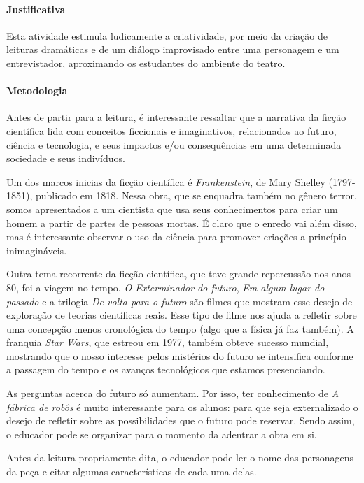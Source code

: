 \documentclass[11pt]{extarticle}
\begin{document}
\paragraph{Justificativa} Esta atividade estimula ludicamente a criatividade, por meio da criação de leituras dramáticas e de um diálogo improvisado entre uma personagem e um entrevistador, aproximando os estudantes do ambiente do teatro.         

\paragraph{Metodologia} Antes de partir para a leitura, é interessante ressaltar que a narrativa da ficção científica lida com conceitos ficcionais e imaginativos, relacionados ao futuro, ciência e tecnologia, e seus impactos e/ou consequências em uma determinada sociedade e seus indivíduos. 

Um dos marcos inicias da ficção científica é \textit{Frankenstein}, de Mary Shelley (1797-1851), publicado em 1818. Nessa obra, que se enquadra também no gênero terror, somos apresentados a um cientista que usa seus conhecimentos para criar um homem a partir de partes de pessoas mortas. É claro que o enredo vai além disso, mas é interessante observar o uso da ciência para promover criações a princípio inimagináveis. 

Outra tema recorrente da ficção científica, que teve grande repercussão nos anos 80, foi a viagem no tempo. \textit{O Exterminador do futuro}, \textit{Em algum lugar do passado} e a trilogia \textit{De volta para o futuro} são filmes que mostram esse desejo de exploração de teorias científicas reais. Esse tipo de filme nos ajuda a refletir sobre uma concepção menos cronológica do tempo (algo que a física já faz também). A franquia \textit{Star Wars}, que estreou em 1977, também obteve sucesso mundial, mostrando que o nosso interesse pelos mistérios do futuro se intensifica conforme a passagem do tempo e os avanços tecnológicos que estamos presenciando. 

As perguntas acerca do futuro só aumentam. Por isso, ter conhecimento de \textit{A fábrica de robôs} é muito interessante para os alunos: para que seja externalizado o desejo de refletir sobre as possibilidades que o futuro pode reservar. Sendo assim, o educador pode se organizar para o momento da adentrar a obra em si.


Antes da leitura propriamente dita, o educador pode ler o nome das personagens da peça e citar algumas características de cada uma delas.
\end{document}
